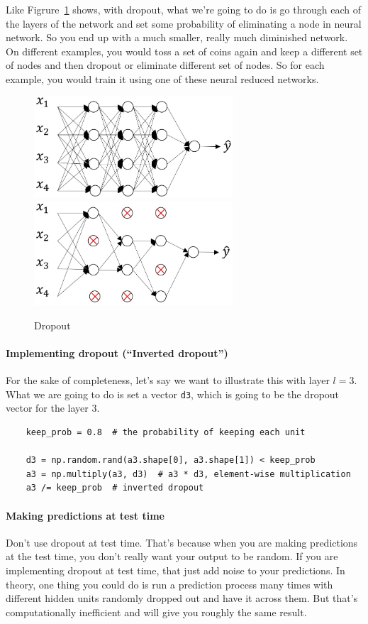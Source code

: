 \documentclass[UTF8]{article}
\begin{document}
Like Figrure~\ref{fig:dropout} shows, with dropout, what we're going to do is go through each of
the layers of the network and set some probability of eliminating a node in neural network. So you
end up with a much smaller, really much diminished network. On different examples, you would toss a
set of coins again and keep a different set of nodes and then dropout or eliminate different set of
nodes. So for each example, you would train it using one of these neural reduced networks.

\begin{figure}[htb]
    \centering
    \includegraphics[width=20em]{figures/dropout-orig}
    \includegraphics[width=20em]{figures/dropout-zero-out}
    \caption{Dropout}
    \label{fig:dropout}
\end{figure}

\paragraph{Implementing dropout (``Inverted dropout'')}
For the sake of completeness, let's say we want to illustrate this with layer $l=3$. What we are
going to do is set a vector \texttt{d3}, which is going to be the dropout vector for the
layer 3.
\begin{verbatim}
    keep_prob = 0.8  # the probability of keeping each unit

    d3 = np.random.rand(a3.shape[0], a3.shape[1]) < keep_prob
    a3 = np.multiply(a3, d3)  # a3 * d3, element-wise multiplication
    a3 /= keep_prob  # inverted dropout
\end{verbatim}

\paragraph{Making predictions at test time}
Don't use dropout at test time. That's because when you are making predictions at the test time,
you don't really want your output to be random. If you are implementing dropout at test time, that
just add noise to your predictions. In theory, one thing you could do is run a prediction process
many times with different hidden units randomly dropped out and have it across them. But that's
computationally inefficient and will give you roughly the same result.
\end{document}
